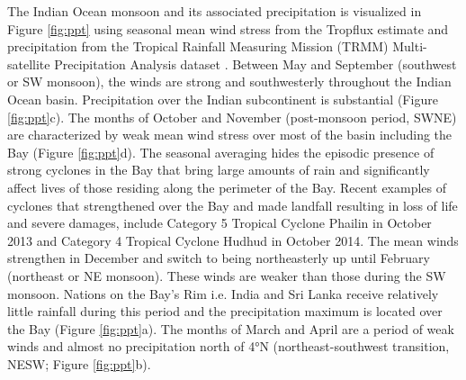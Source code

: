 \documentclass[onecol]{ametsoc}
\begin{document}
The Indian Ocean monsoon and its associated precipitation is visualized in Figure \ref{fig:ppt} using seasonal mean wind stress from the Tropflux estimate \citep{Kumar2012} and precipitation from the Tropical Rainfall Measuring Mission (TRMM) Multi-satellite Precipitation Analysis dataset \citep{trmm}.
Between May and September (southwest or SW monsoon), the winds are strong and southwesterly throughout the Indian Ocean basin.
Precipitation over the Indian subcontinent is substantial (Figure \ref{fig:ppt}c).
The months of October and November (post-monsoon period, SWNE) are characterized by weak mean wind stress over most of the basin including the Bay (Figure \ref{fig:ppt}d). 
The seasonal averaging hides the episodic presence of strong cyclones in the Bay that bring large amounts of rain and significantly affect lives of those residing along the perimeter of the Bay.
Recent examples of cyclones that strengthened over the Bay and made landfall resulting in loss of life and severe damages, include Category 5 Tropical Cyclone Phailin in October 2013 and Category 4 Tropical Cyclone Hudhud in October 2014.
The mean winds strengthen in December and switch to being northeasterly up until February (northeast or NE monsoon).
These winds are weaker than those during the SW monsoon.
Nations on the Bay's Rim i.e. India and Sri Lanka receive relatively little rainfall during this period and the precipitation maximum is located over the Bay (Figure \ref{fig:ppt}a).
The months of March and April are a period of weak winds and almost no precipitation north of 4°N (northeast-southwest transition, NESW; Figure \ref{fig:ppt}b).
\end{document}
